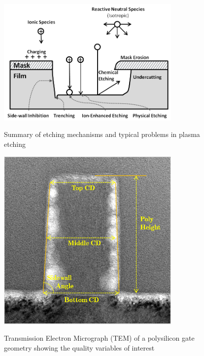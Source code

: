 \begin{figure}[!htpb]
  \centering
  \includegraphics[width=0.8\textwidth]{figures/intro/plasma_etch.png}\\
  \caption{Summary of etching mechanisms and typical problems in plasma etching}
  \label{fig:plasma_etch}
\end{figure}


%
%
%
%
%


\begin{figure}[!htpb]
  \centering
  \includegraphics[width=0.8\textwidth]{figures/application/metrology_meas.png}\\
  \caption{Transmission Electron Micrograph (TEM) of a polysilicon gate geometry showing the quality variables of interest}\label{fig:metrology_examples}
\end{figure}

